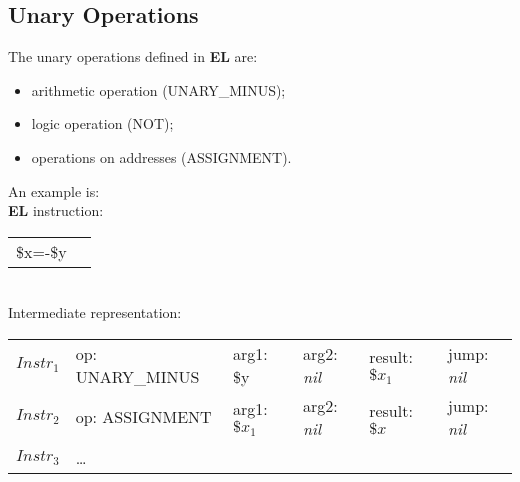 \subsection*{Unary Operations}

The unary operations defined in \textbf{EL} are:

\begin{itemize}

	\item arithmetic operation (UNARY\_MINUS);
	
	\item logic operation (NOT);
	
	\item operations on addresses (ASSIGNMENT).
	
\end{itemize}

An example is:\\
\textbf{EL} instruction:
\begin{table}[H]
\centering
\begin{tabular}{ll}
\$x=-\$y
\end{tabular}
\end{table}
\tab\\
Intermediate representation:
\begin{table}[H]
\centering
\begin{tabular}{llllll}
$Instr_1$ & op: UNARY\_MINUS & arg1: \$y & arg2: \emph{nil} & result: $\$x_1$ & jump: \emph{nil}\\
$Instr_2$ & op: ASSIGNMENT & arg1: $\$x_1$ & arg2: \emph{nil} & result: $\$x$ & jump: \emph{nil}\\
$Instr_3$ & \ldots
\end{tabular}
\end{table} 
